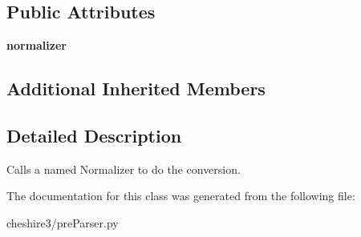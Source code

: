 \subsection*{Public Attributes}
\begin{DoxyCompactItemize}
\item 
\hypertarget{classcheshire3_1_1pre_parser_1_1_normalizer_pre_parser_a38b92b23ce96e239c77b2215445e91e8}{{\bfseries normalizer}}\label{classcheshire3_1_1pre_parser_1_1_normalizer_pre_parser_a38b92b23ce96e239c77b2215445e91e8}

\end{DoxyCompactItemize}
\subsection*{Additional Inherited Members}


\subsection{Detailed Description}
\begin{DoxyVerb}Calls a named Normalizer to do the conversion.\end{DoxyVerb}
 

The documentation for this class was generated from the following file\-:\begin{DoxyCompactItemize}
\item 
cheshire3/pre\-Parser.\-py\end{DoxyCompactItemize}
